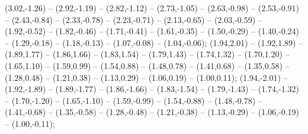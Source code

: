 {   (3.02,-1.26) -- (2.92,-1.19) -- (2.82,-1.12) -- (2.73,-1.05) -- (2.63,-0.98) -- (2.53,-0.91) -- (2.43,-0.84) -- (2.33,-0.78) -- (2.23,-0.71) -- (2.13,-0.65) -- (2.03,-0.59) -- (1.92,-0.52) -- (1.82,-0.46) -- (1.71,-0.41) -- (1.61,-0.35) -- (1.50,-0.29) -- (1.40,-0.24) -- (1.29,-0.18) -- (1.18,-0.13) -- (1.07,-0.08) -- (1.04,-0.06);
   (1.94,2.01) -- (1.92,1.89) -- (1.89,1.77) -- (1.86,1.66) -- (1.83,1.54) -- (1.79,1.43) -- (1.74,1.32) -- (1.70,1.20) -- (1.65,1.10) -- (1.59,0.99) -- (1.54,0.88) -- (1.48,0.78) -- (1.41,0.68) -- (1.35,0.58) -- (1.28,0.48) -- (1.21,0.38) -- (1.13,0.29) -- (1.06,0.19) -- (1.00,0.11);
   (1.94,-2.01) -- (1.92,-1.89) -- (1.89,-1.77) -- (1.86,-1.66) -- (1.83,-1.54) -- (1.79,-1.43) -- (1.74,-1.32) -- (1.70,-1.20) -- (1.65,-1.10) -- (1.59,-0.99) -- (1.54,-0.88) -- (1.48,-0.78) -- (1.41,-0.68) -- (1.35,-0.58) -- (1.28,-0.48) -- (1.21,-0.38) -- (1.13,-0.29) -- (1.06,-0.19) -- (1.00,-0.11);
}
